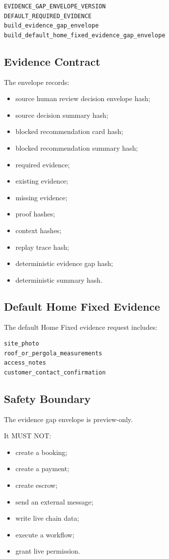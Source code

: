 \begin{verbatim}
EVIDENCE_GAP_ENVELOPE_VERSION
DEFAULT_REQUIRED_EVIDENCE
build_evidence_gap_envelope
build_default_home_fixed_evidence_gap_envelope
\end{verbatim}

\subsection{Evidence Contract}

The envelope records:

\begin{itemize}
  \item source human review decision envelope hash;
  \item source decision summary hash;
  \item blocked recommendation card hash;
  \item blocked recommendation summary hash;
  \item required evidence;
  \item existing evidence;
  \item missing evidence;
  \item proof hashes;
  \item context hashes;
  \item replay trace hash;
  \item deterministic evidence gap hash;
  \item deterministic summary hash.
\end{itemize}

\subsection{Default Home Fixed Evidence}

The default Home Fixed evidence request includes:

\begin{verbatim}
site_photo
roof_or_pergola_measurements
access_notes
customer_contact_confirmation
\end{verbatim}

\subsection{Safety Boundary}

The evidence gap envelope is preview-only.

It MUST NOT:

\begin{itemize}
  \item create a booking;
  \item create a payment;
  \item create escrow;
  \item send an external message;
  \item write live chain data;
  \item execute a workflow;
  \item grant live permission.
\end{itemize}

